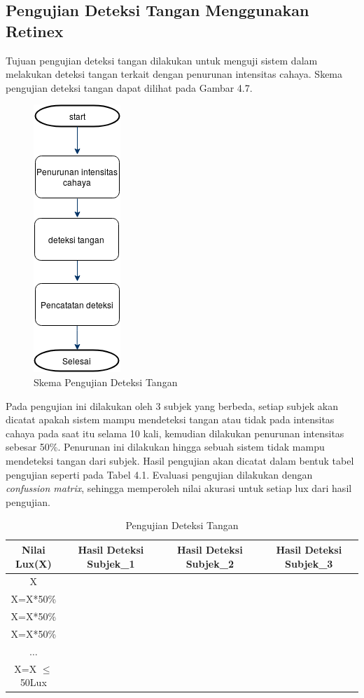 \subsection{Pengujian Deteksi Tangan Menggunakan Retinex}
Tujuan pengujian deteksi tangan dilakukan untuk menguji sistem dalam melakukan deteksi tangan terkait dengan penurunan intensitas cahaya. Skema pengujian deteksi tangan dapat dilihat pada Gambar 4.7.
\begin{figure}[H]
	\centering
	\includegraphics[width=0.2\linewidth]{"skema objek deteksi"}
	\caption{Skema Pengujian Deteksi Tangan}
	\label{fig:skema-objek-deteksi}
\end{figure}
Pada pengujian ini dilakukan oleh 3 subjek yang berbeda, setiap subjek akan dicatat apakah sistem mampu mendeteksi tangan atau tidak pada intensitas cahaya pada saat itu selama 10 kali, kemudian dilakukan penurunan intensitas sebesar 50\%. Penurunan ini dilakukan hingga sebuah sistem tidak mampu mendeteksi tangan dari subjek. Hasil pengujian akan dicatat dalam bentuk tabel pengujian seperti pada Tabel 4.1. Evaluasi pengujian dilakukan dengan \emph{confussion matrix}, sehingga memperoleh nilai akurasi untuk setiap lux dari hasil pengujian.
\begin{table}[H]
	\caption{Pengujian Deteksi Tangan}
	\vspace{0.2cm}
	\centering
	\begin{tabular}{|c|c|c|c|c|c|c|c|c|c|c|c|c|c|c|c|c|c|c|c|c|c|c|c|c|c|c|c|c|c|c|}
		\hline
		Nilai Lux(X) & \multicolumn{10}{|c|}{Hasil Deteksi Subjek\_1} & \multicolumn{10}{|c|}{Hasil Deteksi Subjek\_2}& \multicolumn{10}{|c|}{Hasil Deteksi Subjek\_3}\\
		\hline X & & & &&&&&&&&&&&&&&&&&&&&&&&&&&&\\
		\hline X=X*50\% & & & &&&&&&&&&&&&&&&&&&&&&&&&&&&\\
		\hline X=X*50\% & & & & && &&&&&&&&&&&&&&&&&&&&&&&&\\
		\hline X=X*50\% & & & &&&&&&& &&&&&&&&&&&&&&&&&&&&\\
		\hline $\dots$ & & & & & &&&&&&&&&&&&&&&&&&&&&&&&&\\
		\hline X=X $\le$ 50Lux & & & &&&&&&& &&&&&&&&&&&&&&&&&&&&\\
		\hline
	\end{tabular}
\end{table}
